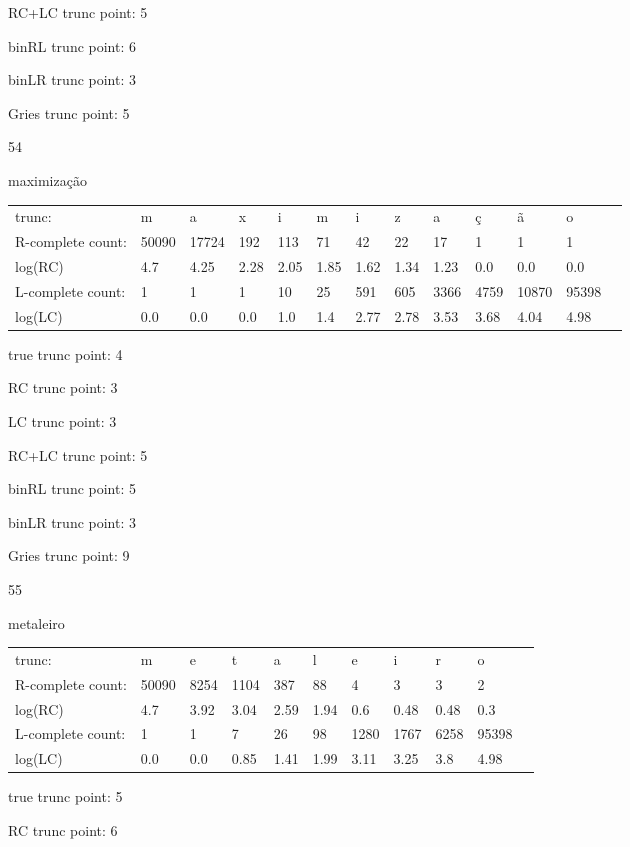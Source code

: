 \documentclass[10pt]{article}
\begin{document}
RC+LC trunc point: 5

binRL trunc point: 6

binLR trunc point: 3

Gries trunc point: 5

\vspace{1em}

54

maximização

\begin{tabular}{l|llllllllllll}
trunc: & m & a & x & i & m & i & z & a & ç & ã & o & \\ 
R-complete count: & 50090 & 17724 & 192 & 113 & 71 & 42 & 22 & 17 & 1 & 1 & 1 & \\ 
log(RC) & 4.7 & 4.25 & 2.28 & 2.05 & 1.85 & 1.62 & 1.34 & 1.23 & 0.0 & 0.0 & 0.0 & \\ 
L-complete count: & 1 & 1 & 1 & 10 & 25 & 591 & 605 & 3366 & 4759 & 10870 & 95398 & \\ 
log(LC) & 0.0 & 0.0 & 0.0 & 1.0 & 1.4 & 2.77 & 2.78 & 3.53 & 3.68 & 4.04 & 4.98 & \\ 
\end{tabular}

true trunc point: 4

RC trunc point: 3

LC trunc point: 3

RC+LC trunc point: 5

binRL trunc point: 5

binLR trunc point: 3

Gries trunc point: 9

\vspace{1em}

55

metaleiro

\begin{tabular}{l|llllllllll}
trunc: & m & e & t & a & l & e & i & r & o & \\ 
R-complete count: & 50090 & 8254 & 1104 & 387 & 88 & 4 & 3 & 3 & 2 & \\ 
log(RC) & 4.7 & 3.92 & 3.04 & 2.59 & 1.94 & 0.6 & 0.48 & 0.48 & 0.3 & \\ 
L-complete count: & 1 & 1 & 7 & 26 & 98 & 1280 & 1767 & 6258 & 95398 & \\ 
log(LC) & 0.0 & 0.0 & 0.85 & 1.41 & 1.99 & 3.11 & 3.25 & 3.8 & 4.98 & \\ 
\end{tabular}

true trunc point: 5

RC trunc point: 6
\end{document}
